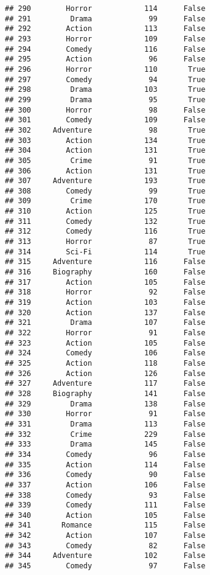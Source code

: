 \documentclass[
]{article}
\begin{document}
\begin{verbatim}
## 290        Horror            114      False
## 291         Drama             99      False
## 292        Action            113      False
## 293        Horror            109      False
## 294        Comedy            116      False
## 295        Action             96      False
## 296        Horror            110       True
## 297        Comedy             94       True
## 298         Drama            103       True
## 299         Drama             95       True
## 300        Horror             98      False
## 301        Comedy            109      False
## 302     Adventure             98       True
## 303        Action            134       True
## 304        Action            131       True
## 305         Crime             91       True
## 306        Action            131       True
## 307     Adventure            193       True
## 308        Comedy             99       True
## 309         Crime            170       True
## 310        Action            125       True
## 311        Comedy            132       True
## 312        Comedy            116       True
## 313        Horror             87       True
## 314        Sci-Fi            114       True
## 315     Adventure            116      False
## 316     Biography            160      False
## 317        Action            105      False
## 318        Horror             92      False
## 319        Action            103      False
## 320        Action            137      False
## 321         Drama            107      False
## 322        Horror             91      False
## 323        Action            105      False
## 324        Comedy            106      False
## 325        Action            118      False
## 326        Action            126      False
## 327     Adventure            117      False
## 328     Biography            141      False
## 329         Drama            138      False
## 330        Horror             91      False
## 331         Drama            113      False
## 332         Crime            229      False
## 333         Drama            145      False
## 334        Comedy             96      False
## 335        Action            114      False
## 336        Comedy             90      False
## 337        Action            106      False
## 338        Comedy             93      False
## 339        Comedy            111      False
## 340        Action            105      False
## 341       Romance            115      False
## 342        Action            107      False
## 343        Comedy             82      False
## 344     Adventure            102      False
## 345        Comedy             97      False

\end{verbatim}
\end{document}
